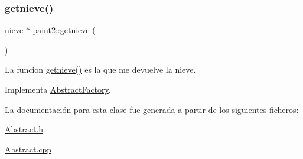 \mbox{\label{classpaint2_a0aeaabfae73dd3ddde19a6636c72732a}} 
\subsubsection{\texorpdfstring{getnieve()}{getnieve()}}
{\footnotesize\ttfamily \hyperlink{classnieve}{nieve} $\ast$ paint2\+::getnieve (\begin{DoxyParamCaption}{ }\end{DoxyParamCaption})\hspace{0.3cm}{\ttfamily [virtual]}}

La funcion \hyperlink{classpaint2_a0aeaabfae73dd3ddde19a6636c72732a}{getnieve()} es la que me devuelve la nieve. 

Implementa \hyperlink{classAbstractFactory}{Abstract\+Factory}.



La documentación para esta clase fue generada a partir de los siguientes ficheros\+:\begin{DoxyCompactItemize}
\item 
\hyperlink{Abstract_8h}{Abstract.\+h}\item 
\hyperlink{Abstract_8cpp}{Abstract.\+cpp}\end{DoxyCompactItemize}

